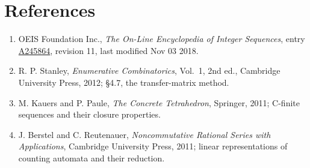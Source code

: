 \documentclass[11pt]{article}
\theoremstyle{definition}
\begin{document}
\section{References}

\begin{enumerate}

\item OEIS Foundation Inc., \emph{The On-Line Encyclopedia of Integer Sequences}, entry \href{https://oeis.org/A245864}{A245864}, revision 11, last modified Nov 03 2018.

\item R. P. Stanley, \emph{Enumerative Combinatorics}, Vol.~1, 2nd ed., Cambridge University Press, 2012; \S4.7, the transfer-matrix method.

\item M. Kauers and P. Paule, \emph{The Concrete Tetrahedron}, Springer, 2011; C-finite sequences and their closure properties.

\item J. Berstel and C. Reutenauer, \emph{Noncommutative Rational Series with Applications}, Cambridge University Press, 2011; linear representations of counting automata and their reduction.

\end{enumerate}
\end{document}
